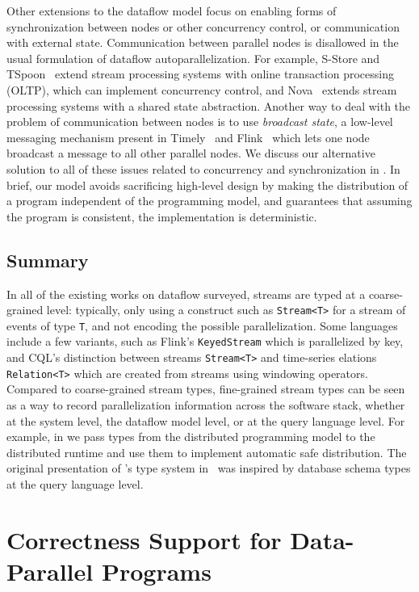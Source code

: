Other extensions to the dataflow model focus on enabling forms of synchronization between nodes or other concurrency control, or communication with external state.
Communication between parallel nodes is disallowed in the usual formulation of dataflow autoparallelization.
For example, S-Store and TSpoon~\cite{meehan2015s,affetti2020tspoon} extend stream processing systems with online transaction processing (OLTP), which can implement concurrency control,
and Nova~\cite{zhao2021timestamped} extends stream processing systems with a shared state abstraction.
Another way to deal with the problem of communication between nodes
is to use \emph{broadcast state}, a low-level messaging mechanism present in
Timely~\cite{BroadcastStateTimely} and Flink~\cite{BroadcastStateFlink}
which lets one node broadcast a message to all other parallel nodes.
We discuss our alternative solution to all of these issues related to concurrency and synchronization in .
In brief, our model avoids sacrificing high-level design by making the distribution of a program independent of the programming model, and guarantees that assuming the program is consistent, the implementation is deterministic.

\subsection{Summary}

In all of the existing works on dataflow surveyed, streams are typed at a coarse-grained level: typically, only using a construct such as \texttt{Stream<T>} for a stream of events of type \texttt{T}, and not encoding the possible parallelization.
Some languages include a few variants, such as Flink's \texttt{KeyedStream} which is parallelized by key, and CQL's distinction between streams \texttt{Stream<T>} and time-series elations \texttt{Relation<T>} which are created from streams using windowing operators.
Compared to coarse-grained stream types, fine-grained stream types can be seen as a way to record parallelization information across the software stack, whether at the system level, the dataflow model level, or at the query language level.
For example, in  we pass types from the distributed programming model to the distributed runtime and use them to implement automatic safe distribution.
The original presentation of 's type system in~ was inspired by database schema types at the query language level.

\section{Correctness Support for Data-Parallel Programs}

